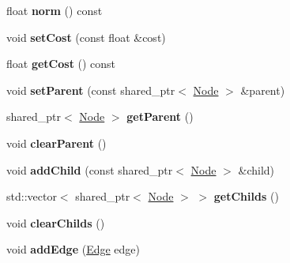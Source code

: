 \begin{DoxyCompactItemize}
\item 
\hypertarget{class_node_a4773ac9f913d974957e7075148f5c5b7}{float {\bfseries norm} () const }\label{class_node_a4773ac9f913d974957e7075148f5c5b7}

\item 
\hypertarget{class_node_aa3c3eacdb00cb8bd1a10a86c8d34e2ee}{void {\bfseries set\-Cost} (const float \&cost)}\label{class_node_aa3c3eacdb00cb8bd1a10a86c8d34e2ee}

\item 
\hypertarget{class_node_a2f39e084f067c581c315f33cc2f87d3c}{float {\bfseries get\-Cost} () const }\label{class_node_a2f39e084f067c581c315f33cc2f87d3c}

\item 
\hypertarget{class_node_a7bf1b7705353fc6e36fcd61393c06370}{void {\bfseries set\-Parent} (const shared\-\_\-ptr$<$ \hyperlink{class_node}{Node} $>$ \&parent)}\label{class_node_a7bf1b7705353fc6e36fcd61393c06370}

\item 
\hypertarget{class_node_a585e94ae0fa6c80c2caee471689260f0}{shared\-\_\-ptr$<$ \hyperlink{class_node}{Node} $>$ {\bfseries get\-Parent} ()}\label{class_node_a585e94ae0fa6c80c2caee471689260f0}

\item 
\hypertarget{class_node_a6c4496fb0c1cca593766765f6878f0e3}{void {\bfseries clear\-Parent} ()}\label{class_node_a6c4496fb0c1cca593766765f6878f0e3}

\item 
\hypertarget{class_node_ae73324eeab0437fc01c42545286e5eaa}{void {\bfseries add\-Child} (const shared\-\_\-ptr$<$ \hyperlink{class_node}{Node} $>$ \&child)}\label{class_node_ae73324eeab0437fc01c42545286e5eaa}

\item 
\hypertarget{class_node_a28a777e512424f44c567e009a61fa114}{std\-::vector$<$ shared\-\_\-ptr$<$ \hyperlink{class_node}{Node} $>$ $>$ {\bfseries get\-Childs} ()}\label{class_node_a28a777e512424f44c567e009a61fa114}

\item 
\hypertarget{class_node_a3c2f953a0a08323110014c5fcb8def22}{void {\bfseries clear\-Childs} ()}\label{class_node_a3c2f953a0a08323110014c5fcb8def22}

\item 
\hypertarget{class_node_ac602522dacc9f56704dbbce5aa75c45c}{void {\bfseries add\-Edge} (\hyperlink{class_edge}{Edge} edge)}\label{class_node_ac602522dacc9f56704dbbce5aa75c45c}


\end{DoxyCompactItemize}
